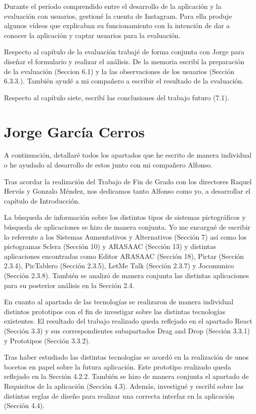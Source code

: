 Durante el período comprendido entre el desarrollo de la aplicación y la evaluación con usuarios, gestioné la cuenta de Instagram. Para ella produje algunos vídeos que explicaban su funcionamiento con la intención de dar a conocer la aplicación y captar usuarios para la evaluación. 

Respecto al capítulo de la evaluación trabajé de forma conjunta con Jorge para diseñar el formulario y realizar el análisis. De la memoria escribí la preparación de la evaluación (Seccion 6.1) y la las observaciones de los usuarios (Sección 6.3.3.). También ayudé a mi compañero a escribir el resultado de la evaluación. 

Respecto al capítulo siete, escribí las conclusiones del trabajo futuro (7.1).


\section{Jorge García Cerros}

A continuación, detallaré todos los apartados que he escrito de manera individual o he ayudado al desarrollo de estos junto con mi compañero Alfonso.


Tras acordar la realización del Trabajo de Fin de Grado con los directores Raquel Hervás y Gonzalo Méndez, nos dedicamos tanto Alfonso como yo, a desarrollar el capítulo de Introducción.


La búsqueda de información sobre los distintos tipos de sistemas pictográficos y búsqueda de aplicaciones se hizo de manera conjunta. Yo me encargué de escribir lo referente a los Sistemas Aumentativos y Alternativos (Sección 7) así como los pictogramas Sclera (Sección 10) y ARASAAC (Sección 13) y distintas aplicaciones encontradas como Editor ARASAAC (Sección 18), Pictar (Sección 2.3.4), PicTablero (Sección 2.3.5), LetMe Talk (Sección 2.3.7) y Jocomunico (Sección 2.3.8). También se analizó de manera conjunta las distintas aplicaciones para su posterior análisis en la Sección 2.4.


En cuanto al apartado de las tecnologías se realizaron de manera individual distintos prototipos con el fin de investigar sobre las distintas tecnologías existentes. El resultado del trabajo realizado queda reflejado en el apartado React (Sección 3.3) y sus correspondientes subapartados Drag and Drop (Sección 3.3.1) y Prototipos (Sección 3.3.2).


Tras haber estudiado las distintas tecnologías se acordó en la realización de unos bocetos en papel sobre la futura aplicación. Este prototipo realizado queda reflejado en la Sección 4.2.2. También se hizo de manera conjunta el apartado de Requisitos de la aplicación (Sección 4.3). Además, investigué y escribí sobre las distintas reglas de diseño para realizar una correcta interfaz en la aplicación (Sección 4.4).


